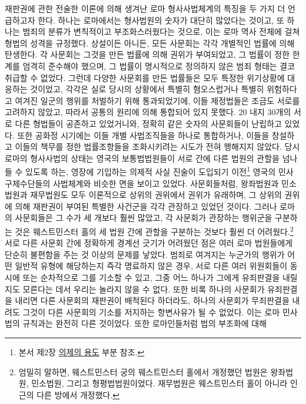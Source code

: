 재판권에 관한 전술한 이론에 의해 생겨난
로마 형사사법체계의 특징을 두 가지 더 언급하고자 한다.
하나는 로마에서는 형사법원의 숫자가 대단히 많았다는 것이고,
또 하나는
범죄의 분류가 변칙적이고 부조화스러웠다는 것으로, 이는
로마 역사 전체에 걸쳐 형법의 성격을 규정했다.
상설이든 아니든, 모든 사문회는
각각 개별적인 법률에 의해 탄생한다.
각 사문회는 그것을 만든 법률에 의해 권위가 부여되었고,
그 법률이 정한 한계를 엄격히 준수해야 했으며,
그 법률이 명시적으로 정의하지 않은 범죄 형태는 결코 취급할 수 없었다.
그런데 다양한 사문회를 만든 법률들은
모두 특정한 위기상황에 대응하는 것이었고,
각각은 실로 당시의 상황에서
특별히 혐오스럽거나 특별히 위험하다고 여겨진
일군의 행위를 처벌하기 위해 통과되었기에,
이들 제정법들은 조금도 서로를 고려하지 않았고,
따라서 공통의 원리에 의해 통합되어 있지 못했다.
20 내지 30개의 서로 다른 형법들이 공존하고 있었거니와,
정확히 같은 숫자의 사문회들이 난립하고 있었다.
또한 공화정 시기에는
이들 개별 사법조직들을 하나로 통합하거나,
이들을 창설하고 이들의 책무를 정한 법률조항들을 조화시키려는
시도가 전혀 행해지지 않았다.
당시 로마의 형사사법의 상태는
영국의 보통법법원들이
서로 간에 다른 법원의 관할을 넘나들 수 있도록 하는,
영장에 기입하는
의제적 사실 진술이
도입되기 이전\footnote{%
  본서 제2장 \hyperlink{commonlawfiction}{의제의 용도} 부분 참조.}
영국의 민사 구제수단들의 사법체계와
비슷한 면을 보이고 있었다.
사문회들처럼,
왕좌법원과 민소법원과 재무법원도 모두
이론적으로
상위의 권위에서 권위가 유래하며,
그 상위의 권위에 의해 재판권이 부여된
특별한 사건군을 각각 관장하고 있었던 것이다.
그러나 로마의 사문회들은 그 수가 세 개보다 훨씬 많았고,
각 사문회가 관장하는 행위군을 구분하는 것은
웨스트민스터 홀의 세 법원 간에 관할을 구분하는 것보다
훨씬 더 어려웠다.\footnote{%
  엄밀히 말하면, 웨스트민스터 궁의 웨스트민스터 홀에서
  개정했던 법원은 왕좌법원, 민소법원, 그리고 형평법법원이었다.
  재무법원은 웨스트민스터 홀이 아니라 인근의 다른 방에서 개정했다.
  }
서로 다른 사문회 간에 정확하게 경계선 긋기가 어려웠던 점은
여러 로마 법원들에게 단순히 불편함을 주는 것 이상의 문제를 낳았다.
범죄로 여겨지는 누군가의 행위가 어떤 일반적 유형에 해당하는지
즉각 명료하지 않은 경우,
서로 다른 여러 위원회들이
동시에 또는 순차적으로 그를 기소할 수 있고,
그중 어느 하나가
그에게 유죄판결을 내릴지도 모른다는 데서
우리는 놀라지 않을 수 없다.
또한 비록 하나의 사문회가 유죄판결을 내리면
다른 사문회의 재판권이 배척된다 하더라도,
하나의 사문회가 무죄판결을 내려도 그것이
다른 사문회의 기소를 저지하는 항변사유가 될 수 없었다.
이는 로마 민사법의 규칙과는 완전히 다른 것이었다.
또한 로마인들처럼 법의 부조화에 대해
